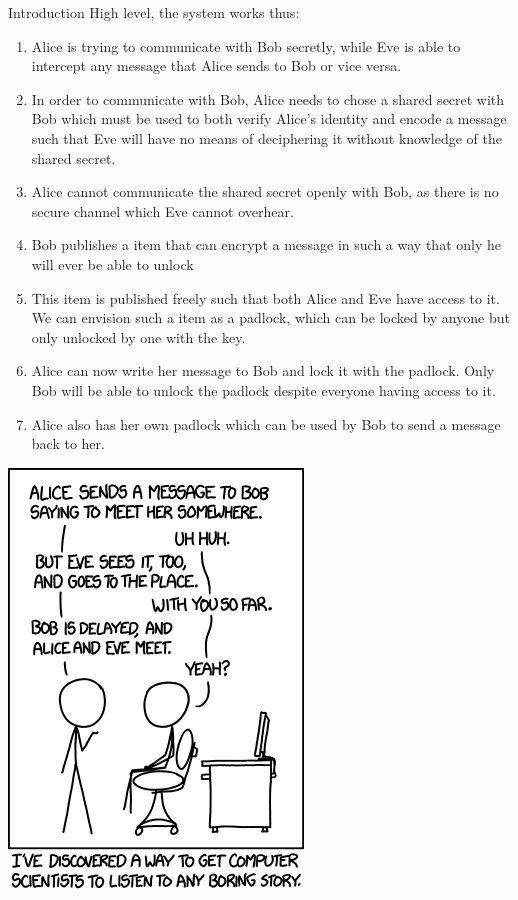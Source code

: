 \documentclass[landscape,fontscale=.4,paperwidth=48in,paperheight=36in]{baposter} %
\begin{document}
\begin{poster}
\begin{posterbox}[name=intro,column=0,below=objectives, span=13]{Introduction}
High level, the system works thus:
\begin{enumerate}
	\item Alice is trying to communicate with Bob secretly, while Eve is able to intercept any message that Alice sends to Bob or vice versa.
	\item In order to communicate with Bob, Alice needs to chose a shared secret with Bob which must be used to both verify Alice's identity and encode a message such that Eve will have no means of deciphering it without knowledge of the shared secret.
	\item Alice cannot communicate the shared secret openly with Bob, as there is no secure channel which Eve cannot overhear.
	\item Bob publishes a item that can encrypt a message in such a way that only he will ever be able to unlock
	\item This item is published freely such that both Alice and Eve have access to it. We can envision such a item as a padlock, which can be locked by anyone but only unlocked by one with the key.
	\item Alice can now write her message to Bob and lock it with the padlock. Only Bob will be able to unlock the padlock despite everyone having access to it.
	\item Alice also has her own padlock which can be used by Bob to send a message back to her.
\end{enumerate}

\begin{center}
\includegraphics[width=.5\linewidth]{xkcd.png}
\end{center}


\end{posterbox}
\end{poster}
\end{document}
